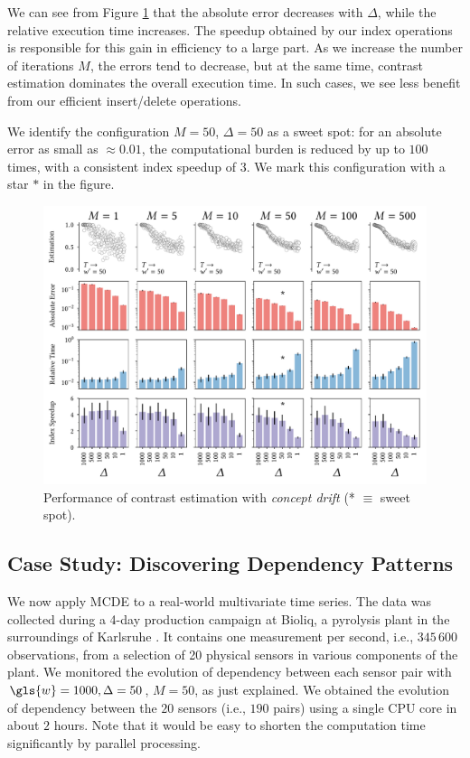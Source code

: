 We can see from Figure \ref{fig:stream-experiment} that the absolute error decreases with $\Delta$, while the relative execution time increases. 
The speedup obtained by our index operations is responsible for this gain in efficiency to a large part. 
As we increase the number of iterations $M$, the errors tend to decrease, but at the same time, contrast estimation dominates the overall execution time. 
In such cases, we see less benefit from our efficient insert/delete operations. 

We identify the configuration $M=50$, $\Delta=50$ as a sweet spot: for an absolute error as small as $\approx0.01$, the computational burden is reduced by up to $100$ times, with a consistent index speedup of $3$. We mark this configuration with a star $*$ in the figure. 
 
\begin{figure}
	\centering
    \includegraphics[width=\linewidth]{part2-figures/all_thesis-compressed.pdf}
    \caption{Performance of contrast estimation with \textit{concept drift} (* $\equiv$ sweet spot).}
    \label{fig:stream-experiment} 
\end{figure} 

\subsection{Case Study: Discovering Dependency Patterns}

We now apply \gls{MCDE} to a real-world multivariate time series. 
The data was collected during a 4-day production campaign at \gls{Bioliq}, a pyrolysis plant in the surroundings of Karlsruhe  \cite{pfitzer2016fast}. It contains one measurement per second, i.e., $345\,600$ observations, from a selection of 20 physical sensors %
in various components of the plant. 
We monitored the evolution of dependency between each sensor pair with $\gls{w} = 1000,  \Delta = 50$, $M=50$, as just explained. 
We obtained the evolution of dependency between the $20$ sensors (i.e., $190$ pairs) using a single CPU core in about $2$ hours. Note that it would be easy to shorten the computation time significantly by parallel processing.  

